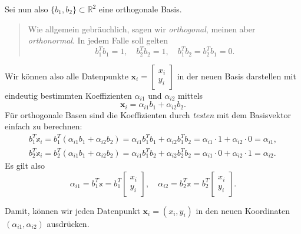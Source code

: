 \documentclass[]{book}
\newenvironment {JHSAYS} [0] {\begin{quote}\color{jhsc}} {\end{quote}}
\theoremstyle{definition}
\theoremstyle{definition}
\theoremstyle{definition}
\theoremstyle{definition}
\theoremstyle{remark}
\begin{document}
Sei nun also \(\{b_1,b_2\}\subset \mathbb R^{2}\) eine orthogonale Basis.

\leavevmode\hypertarget{rem-ortho-bas}{}%
\begin{JHSAYS}
Wie allgemein gebräuchlich, sagen wir \emph{orthogonal}, meinen aber \emph{orthonormal}. In jedem Falle soll gelten
\begin{equation*}
b_1^T b_1=1, \quad b_2^Tb_2=1, \quad b_1^Tb_2 = b_2^Tb_1 = 0.
\end{equation*}

\end{JHSAYS}

Wir können also alle Datenpunkte
\(\mathbf x_i = \begin{bmatrix} x_i \\ y_i \end{bmatrix}\)
in der neuen Basis darstellen mit eindeutig bestimmten Koeffizienten \(\alpha_{i1}\) und \(\alpha_{i2}\) mittels
\begin{equation*}
\mathbf x_i = \alpha_{i1}b_1 + \alpha_{i2}b_2.
\end{equation*}
Für orthogonale Basen sind die Koeffizienten durch \emph{testen} mit dem Basisvektor einfach zu berechnen:
\begin{align*}
b_1^T\mathbb x_i = b_1^T(\alpha_{i1}b_1 + \alpha_{i2}b_2) = \alpha_{i1}b_1^Tb_1 + \alpha_{i2}b_1^Tb_2 = \alpha_{i1}\cdot 1 + \alpha_{i2} \cdot 0 = \alpha_{i1},\\
b_2^T\mathbb x_i = b_2^T(\alpha_{i1}b_1 + \alpha_{i2}b_2) = \alpha_{i1}b_1^Tb_2 + \alpha_{i2}b_2^Tb_2 = \alpha_{i1}\cdot 0 + \alpha_{i2}\cdot 1 = \alpha_{i2}.
\end{align*}
Es gilt also
\begin{equation*}
\alpha_{i1} = b_1^T\mathbb x = b_1^T\begin{bmatrix}
x_i \\ y_i
\end{bmatrix}, \quad
\alpha_{i2} = b_2^T\mathbb x = b_2^T\begin{bmatrix}
x_i \\ y_i
\end{bmatrix}.
\end{equation*}

Damit, können wir jeden Datenpunkt \(\mathbf x_i=(x_i, y_i)\) in den neuen Koordinaten \((\alpha_{i1}, \alpha_{i2})\) ausdrücken.
\end{document}

